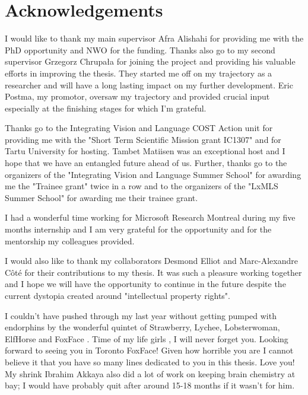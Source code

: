 {}

\chapter*{Acknowledgements}

I would like to thank my main supervisor  Afra Alishahi for providing me with the PhD opportunity 
and NWO for the funding. Thanks also go to my second supervisor Grzegorz Chrupała for joining the project
and providing his valuable efforts in improving the thesis. 
They started me off on my trajectory as a researcher and will have a long lasting 
impact on my further development.
Eric Postma, my promotor, oversaw my trajectory and provided crucial input especially at the finishing stages
for which I'm grateful. 

Thanks go to the Integrating Vision and Language COST Action unit for providing me with the
"Short Term Scientific Mission grant IC1307" and for Tartu University for hosting. 
Tambet Matiisen was an exceptional host and I hope that we have an entangled future ahead of us.
Further, thanks go to the organizers of the "Integrating Vision and Language Summer School" for 
awarding me the "Trainee grant" twice in a row and to the organizers of the "LxMLS Summer School"
for awarding me their trainee grant. 

I had a wonderful time working for Microsoft Research Montreal during my five months internship
and I am very grateful for the opportunity and for the mentorship my colleagues provided.

I would also like to thank my collaborators Desmond Elliot and Marc-Alexandre Côté for their contributions
to my thesis. It was such a pleasure working together and I hope we will have the opportunity to continue in the
future despite the current dystopia created around "intellectual property rights".


I couldn't have pushed through my last year without getting pumped with endorphins 
by the wonderful quintet of Strawberry, Lychee, Lobsterwoman, ElfHorse and FoxFace . 
Time of my life girls , I will never forget you.  
Looking forward to seeing you in Toronto FoxFace! Given how horrible you are I cannot believe
it that you have so many lines dedicated to you in this thesis. Love you!
My shrink Ibrahim Akkaya also did a lot of work on keeping brain chemistry at bay; 
I would have probably quit after around 15-18 months if it wasn't for him. 

